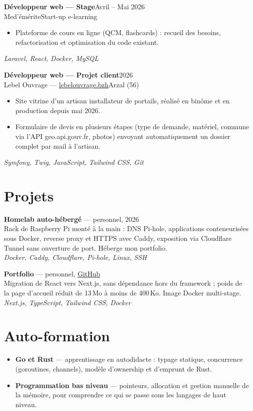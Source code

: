 \documentclass[10pt,a4paper]{article}
\newcommand{\entry}[4]{%
  \textbf{#1}\hfill{\color{muted}#2}\\
  {\color{accent}#3}\hfill{\color{muted}\small #4}\par\vspace{0.2ex}}
\newcommand{\stack}[1]{{\color{muted}\small\textit{#1}}\par}
\newcommand{\project}[4]{%
  \textbf{#1} {\color{muted}\small — #2}\\
  #3\\
  \stack{#4}\vspace{0.7ex}}
\begin{document}
\entry{Développeur web — Stage}{Avril -- Mai 2026}{Med'émérite}{Start-up e-learning}
\begin{itemize}
  \item Plateforme de cours en ligne (QCM, flashcards) : recueil des besoins,
        refactorisation et optimisation du code existant.
\end{itemize}
\stack{Laravel, React, Docker, MySQL}
\vspace{1ex}

\entry{Développeur web — Projet client}{2026}{Lebel Ouvrage — \href{https://lebelouvrage.bzh}{lebelouvrage.bzh}}{Arzal (56)}
\begin{itemize}
  \item Site vitrine d'un artisan installateur de portails, réalisé en binôme et en production depuis mai 2026.
  \item Formulaire de devis en plusieurs étapes (type de demande, matériel, commune via l'API
        geo.api.gouv.fr, photos) envoyant automatiquement un dossier complet par mail à l'artisan.
\end{itemize}
\stack{Symfony, Twig, JavaScript, Tailwind CSS, Git}

\section{Projets}

\project{Homelab auto-hébergé}{personnel, 2026}
  {Rack de Raspberry Pi monté à la main : DNS Pi-hole, applications conteneurisées sous Docker,
   reverse proxy et HTTPS avec Caddy, exposition via Cloudflare Tunnel sans ouverture de port.
   Héberge mon portfolio.}
  {Docker, Caddy, Cloudflare, Pi-hole, Linux, SSH}

\project{Portfolio}{personnel, \href{https://github.com/MaxencePeq/portfolio}{GitHub}}
  {Migration de React vers Next.js, sans dépendance hors du framework ; poids de la page
   d'accueil réduit de 13\,Mo à moins de 400\,Ko. Image Docker multi-stage.}
  {Next.js, TypeScript, Tailwind CSS, Docker}

\section{Auto-formation}
\begin{itemize}
  \item \textbf{Go et Rust} — apprentissage en autodidacte : typage statique, concurrence
        (goroutines, channels), modèle d'ownership et d'emprunt de Rust.
  \item \textbf{Programmation bas niveau} — pointeurs, allocation et gestion manuelle de la mémoire,
        pour comprendre ce qui se passe sous les langages de haut niveau.
\end{itemize}
\end{document}
